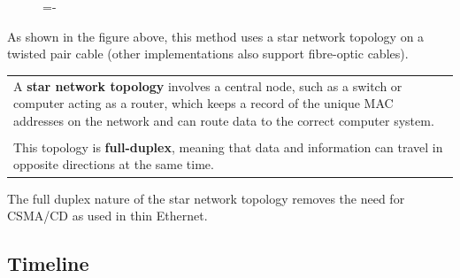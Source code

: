\documentclass[a4paper]{systems-software}
\begin{document}
\begin{figure}[H]
	\lineskip=-\fboxrule
\end{figure}

As shown in the figure above, this method uses a star network topology on a twisted pair cable (other implementations also support fibre-optic cables).

\begin{longtabu} to \textwidth {| X[1,l] |}
	\hline
	A \textbf{star network topology}  involves a central node, such as a switch or computer acting as a router, which keeps a record of the unique MAC addresses on the network and can route data to the correct computer system. \\ \\
	
	This topology is \textbf{full-duplex}, meaning that data and information can travel in opposite directions at the same time. \\
	\hline
\end{longtabu}

The full duplex nature of the star network topology removes the need for CSMA/CD as used in thin Ethernet.


\subsection*{Timeline}
\end{document}

